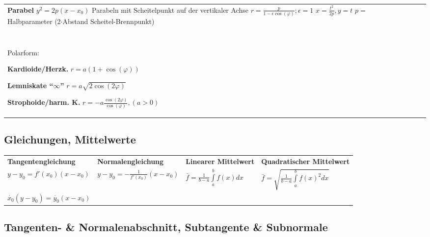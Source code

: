 \begin{tabular}{llll}
{}

\parbox{8cm}{
\textbf{Parabel}\\
$y^2 = 2p(x-x_0)$\\
Parabeln mit Scheitelpunkt auf der vertikaler Achse\\
$r = \frac{p}{1 - \epsilon \cos(\varphi)}; \epsilon = 1$\\
$x= \frac{t^2}{2p}, y = t$\\
$p=$Halbparameter (2$\cdot$Abstand Scheitel-Brennpunkt)
}\\ \\

\parbox{2.7cm}{
\textbf{} \\
Polarform:
}

\parbox{5cm}{
\textbf{Kardioide/Herzk. } \\
$r = a(1+\cos(\varphi))$
}

\parbox{5cm}{
\textbf{Lemniskate ``$\infty$'' } \\
$r = a\sqrt{2\cos(2\varphi)}$ 
}

\parbox{5cm}{
\textbf{Strophoide/harm. K. } \\
$ r = -a \frac{\cos(2\varphi)}{\cos(\varphi)},(a>0) $ 
}

\end{tabular}

\subsection{Gleichungen, Mittelwerte}
\begin{tabular}{llll}
	\textbf{Tangentengleichung} &
	\textbf{Normalengleichung} &
	\textbf{Linearer Mittelwert} &
	\textbf{Quadratischer Mittelwert}\\
	$y-y_0=f'(x_0)(x-x_0)$ &
	$y-y_0=-\frac{1}{f'(x_0)}(x-x_0)$ &
	$\bar{f} = \frac{1}{b-a} \int\limits_{a}^{b} f(x)dx$ &
	$\bar{f} = \sqrt{\frac{1}{b-a} \int\limits_{a}^{b} f(x)^2dx}$ \\
	$\dot{x_0}(y-y_0) = \dot{y_0}(x-x_0)$ \\
\end{tabular}
	
\subsection{Tangenten- \& Normalenabschnitt, Subtangente \& Subnormale}

